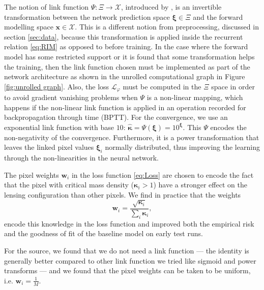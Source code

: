 The notion of link function $\Psi: \Xi \rightarrow \mathcal{X}$, 
introduced by \citet{Putzky2017}, is an invertible transformation 
between the network prediction space $\boldsymbol{\xi} \in \Xi$ 
and the forward modelling space $\mathbf{x} \in \mathcal{X}$.
This is a different notion from preprocessing, discussed in section \ref{sec:data}, 
because this transformation is applied inside the recurrent relation \ref{eq:RIM} 
as opposed to before training. In the case where the forward model has some restricted 
support or it is found that some transformation helps the training, then 
the link function chosen must be implemented as part of the network architecture as 
shown in the unrolled computational graph in Figure \ref{fig:unrolled graph}.
Also, the loss $\mathcal{L}_\varphi$ must be computed in the $\Xi$ space in order 
to avoid gradient vanishing problems when $\Psi$ is a non-linear mapping, which 
happens if the non-linear link function is applied in an 
operation recorded for backpropagation through time (BPTT). 
For the convergence, we use an exponential link function with base $10$: 
$\boldsymbol{\hat{\kappa}} = \Psi(\boldsymbol{\xi}) = 10^{\boldsymbol{\xi}}$. 
This $\Psi$ encodes the non-negativity of the convergence. Furthermore, 
it is a power transformation that leaves the linked 
pixel values $\boldsymbol{\xi}_i$ normally distributed, thus improving the 
learning through the non-linearities in the neural network.

The pixel weights $\mathbf{w}_i$ in the loss function \eqref{eq:Loss}
are chosen to encode the fact that the pixel with critical mass density ($\boldsymbol{\kappa}_i > 1$) 
have a stronger effect on the lensing configuration than other pixels. 
We find in practice that the weights 
\begin{equation}\label{eq:convergence weights} 
        \mathbf{w}_i = \frac{\sqrt{\boldsymbol{\kappa}_i}}{ \sum_i \boldsymbol{\kappa}_i}, 
\end{equation} 
encode this knowledge in the loss function and improved both the empirical 
risk and the goodness of fit of the baseline model on early test runs.

For the source, we found that we do not need a link function 
--- the identity is generally better compared to other link function we tried like sigmoid and 
power transforms --- and we found that the pixel weights can be taken to 
be uniform, i.e. $\mathbf{w}_i = \frac{1}{M}$.


